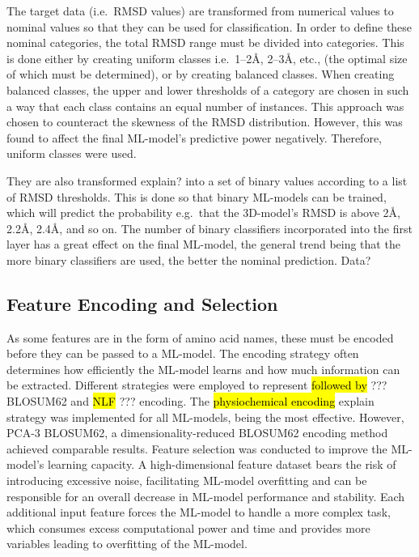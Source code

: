 \documentclass[12pt]{article}
\newcommand{\lilian}[1]{ {\color{red}{\bfseries Lilian:} #1}}
\newcommand{\highlight}[1]{\hl{#1}}
\begin{document}
The target data (i.e.\ RMSD values) are transformed from numerical
values to nominal values so that they can be used for
classification. In order to define these nominal categories, the total
RMSD range must be divided into categories. This is done either by
creating uniform classes i.e.\ 1--2\AA, 2--3\AA, etc., (the optimal size of which
must be determined), or by creating balanced classes. When
creating balanced classes, the upper and lower thresholds of a
category are chosen in such a way that each class contains an equal
number of instances. This approach was chosen to counteract the
skewness of the RMSD distribution. However, this was found to
affect the final ML-model's predictive power negatively. Therefore,
uniform classes were used.

They are also transformed \lilian{explain?} into a set of binary values according to a
list of RMSD thresholds. This is done so that binary ML-models can be
trained, which will predict the probability e.g.\ that the 3D-model's RMSD
is above 2\AA, 2.2\AA, 2.4\AA, and so on. The number of binary
classifiers incorporated into the first layer has a great effect on
the final ML-model, the general trend being that the more binary
classifiers are used, the better the nominal prediction. \lilian{Data?}

\subsection{Feature Encoding and Selection}

As some features are in the form of amino acid names, these must be
encoded before they can be passed to a ML-model. The
encoding strategy often determines how efficiently the ML-model learns
and how much information can be extracted. Different strategies were
employed to represent \highlight{followed by}\lilian{???} BLOSUM62\cite{XXXX} and \highlight{NLF}\lilian{???}\cite{XXXX} encoding. The
\highlight{physiochemical encoding}\lilian{explain} strategy was implemented for all ML-models, being
the most effective. However, PCA-3 BLOSUM62\cite{XXXX}, a dimensionality-reduced
BLOSUM62 encoding method achieved comparable results.
Feature selection was conducted to improve the ML-model's learning
capacity. A high-dimensional feature dataset bears the risk of
introducing excessive noise, facilitating ML-model overfitting and can be
responsible for an overall decrease in ML-model performance and
stability. Each additional input feature forces the ML-model to
handle a more complex task, which consumes excess computational power
and time and provides more variables leading to overfitting of the ML-model.
\end{document}
